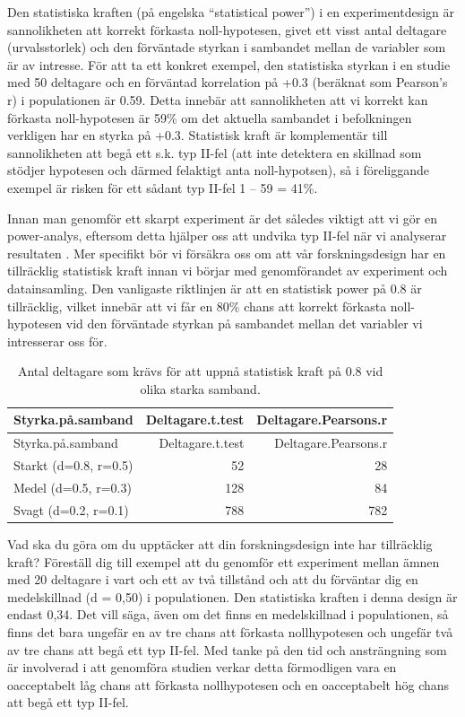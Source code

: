 \documentclass[
]{book}
\begin{document}
Den statistiska kraften (på engelska ``statistical power'') i en experimentdesign är sannolikheten att korrekt förkasta noll-hypotesen, givet ett visst antal deltagare (urvalsstorlek) och den förväntade styrkan i sambandet mellan de variabler som är av intresse. För att ta ett konkret exempel, den statistiska styrkan i en studie med 50 deltagare och en förväntad korrelation på +0.3 (beräknat som Pearson's r) i populationen är 0.59. Detta innebär att sannolikheten att vi korrekt kan förkasta noll-hypotesen är 59\% om det aktuella sambandet i befolkningen verkligen har en styrka på +0.3. Statistisk kraft är komplementär till sannolikheten att begå ett s.k. typ II-fel (att inte detektera en skillnad som stödjer hypotesen och därmed felaktigt anta noll-hypotsen), så i föreliggande exempel är risken för ett sådant typ II-fel 1 -- 59 = 41\%.

Innan man genomför ett skarpt experiment är det således viktigt att vi gör en power-analys, eftersom detta hjälper oss att undvika typ II-fel när vi analyserar resultaten \citep{cohen1992power}. Mer specifikt bör vi försäkra oss om att vår forskningsdesign har en tillräcklig statistisk kraft innan vi börjar med genomförandet av experiment och datainsamling. Den vanligaste riktlinjen är att en statistisk power på 0.8 är tillräcklig, vilket innebär att vi får en 80\% chans att korrekt förkasta noll-hypotesen vid den förväntade styrkan på sambandet mellan det variabler vi intresserar oss för.

\begin{longtable}[]{@{}lrr@{}}
\caption{\label{tab:tab-02-07-1-1-01}Antal deltagare som krävs för att uppnå statistisk kraft på 0.8 vid olika starka samband.}\tabularnewline
\toprule
Styrka.på.samband & Deltagare.t.test & Deltagare.Pearsons.r\tabularnewline
\midrule
\endfirsthead
\toprule
Styrka.på.samband & Deltagare.t.test & Deltagare.Pearsons.r\tabularnewline
\midrule
\endhead
Starkt (d=0.8, r=0.5) & 52 & 28\tabularnewline
Medel (d=0.5, r=0.3) & 128 & 84\tabularnewline
Svagt (d=0.2, r=0.1) & 788 & 782\tabularnewline
\bottomrule
\end{longtable}

Vad ska du göra om du upptäcker att din forskningsdesign inte har tillräcklig kraft? Föreställ dig till exempel att du genomför ett experiment mellan ämnen med 20 deltagare i vart och ett av två tillstånd och att du förväntar dig en medelskillnad (d = 0,50) i populationen. Den statistiska kraften i denna design är endast 0,34. Det vill säga, även om det finns en medelskillnad i populationen, så finns det bara ungefär en av tre chans att förkasta nollhypotesen och ungefär två av tre chans att begå ett typ II-fel. Med tanke på den tid och ansträngning som är involverad i att genomföra studien verkar detta förmodligen vara en oacceptabelt låg chans att förkasta nollhypotesen och en oacceptabelt hög chans att begå ett typ II-fel.
\end{document}
